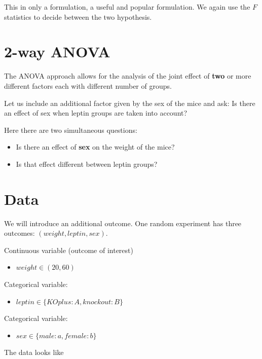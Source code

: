 \documentclass[
]{book}
\providecommand{\tightlist}{%
  \setlength{\itemsep}{0pt}\setlength{\parskip}{0pt}}
\begin{document}
This in only a formulation, a useful and popular formulation. We again use the \(F\) statistics to decide between the two hypothesis.

\hypertarget{way-anova}{%
\section{2-way ANOVA}\label{way-anova}}

The ANOVA approach allows for the analysis of the joint effect of \textbf{two} or more different factors each with different number of groups.

Let us include an additional factor given by the sex of the mice and ask: Is there an effect of sex when leptin groups are taken into account?

Here there are two simultaneous questions:

\begin{itemize}
\item
  Is there an effect of \textbf{sex} on the weight of the mice?
\item
  Is that effect different between leptin groups?
\end{itemize}

\hypertarget{data-4}{%
\section{Data}\label{data-4}}

We will introduce an additional outcome. One random experiment has three outcomes: \((weight, leptin, sex)\).

Continuous variable (outcome of interest)

\begin{itemize}
\tightlist
\item
  \(weight \in (20, 60)\)
\end{itemize}

Categorical variable:

\begin{itemize}
\tightlist
\item
  \(leptin \in \{KOplus:A,knockout:B\}\)
\end{itemize}

Categorical variable:

\begin{itemize}
\tightlist
\item
  \(sex \in \{male:a,female:b\}\)
\end{itemize}

The data looks like
\end{document}

